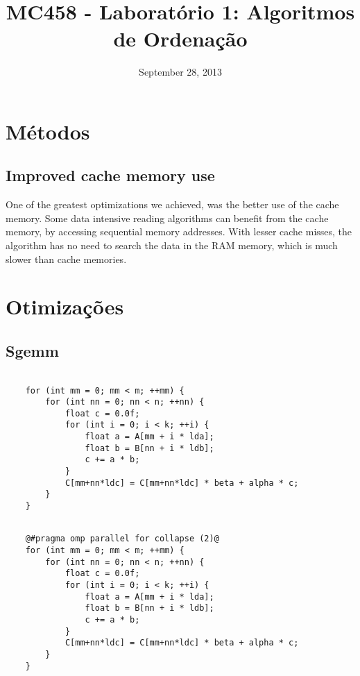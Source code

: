 \documentclass[10pt,a4paper]{report}
\author{}
\title{MC458 - Laboratório 1: Algoritmos de Ordenação}
\date{September 28, 2013}
\begin{document}
\maketitle

\tableofcontents


\chapter{Métodos}

\section{Improved cache memory use}

One of the greatest optimizations we achieved, was the better use of the cache memory. Some data intensive reading algorithms can benefit from the cache memory, by accessing sequential memory addresses. With lesser cache misses, the algorithm has no need to search the data in the RAM memory, which is much slower than cache memories.


\chapter{Otimizações}
\newpage
\section{Sgemm}

\begin{center}
\begin{minipage}{.48\textwidth}\small
\begin{lstlisting}[caption=Parboil sequential source code for sgemm,style=base]

	for (int mm = 0; mm < m; ++mm) {
		for (int nn = 0; nn < n; ++nn) {
			float c = 0.0f;
			for (int i = 0; i < k; ++i) {
				float a = A[mm + i * lda]; 
				float b = B[nn + i * ldb];
				c += a * b;
			}
			C[mm+nn*ldc] = C[mm+nn*ldc] * beta + alpha * c;
		}
	}
\end{lstlisting}
\end{minipage}
\hfill
\begin{minipage}{.48\textwidth}\small
\begin{lstlisting}[caption=Parboil parallel source code for sgemm,style=base]

	@#pragma omp parallel for collapse (2)@
	for (int mm = 0; mm < m; ++mm) {
		for (int nn = 0; nn < n; ++nn) {
			float c = 0.0f;
			for (int i = 0; i < k; ++i) {
				float a = A[mm + i * lda]; 
				float b = B[nn + i * ldb];
				c += a * b;
			}
			C[mm+nn*ldc] = C[mm+nn*ldc] * beta + alpha * c;
		}
	}
\end{lstlisting}
\end{minipage}
\end{center}
\end{document}
